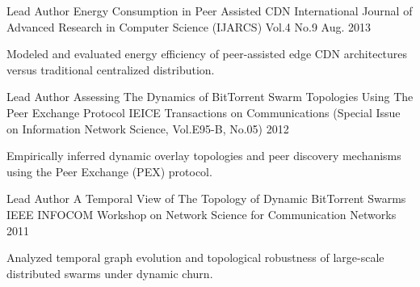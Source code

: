 

\begin{cventries}

  \cventry
    {Lead Author} %
    {Energy Consumption in Peer Assisted CDN} %
    {International Journal of Advanced Research in Computer Science (IJARCS) Vol.4 No.9} %
    {Aug. 2013} %
    {
      \begin{cvitems} %
        \item {Modeled and evaluated energy efficiency of peer-assisted edge CDN architectures versus traditional centralized distribution.}
      \end{cvitems}
    }

  \cventry
    {Lead Author} %
    {Assessing The Dynamics of BitTorrent Swarm Topologies Using The Peer Exchange Protocol} %
    {IEICE Transactions on Communications (Special Issue on Information Network Science, Vol.E95-B, No.05)} %
    {2012} %
    {
      \begin{cvitems} %
        \item {Empirically inferred dynamic overlay topologies and peer discovery mechanisms using the Peer Exchange (PEX) protocol.}
      \end{cvitems}
    }

  \cventry
    {Lead Author} %
    {A Temporal View of The Topology of Dynamic BitTorrent Swarms} %
    {IEEE INFOCOM Workshop on Network Science for Communication Networks} %
    {2011} %
    {
      \begin{cvitems} %
        \item {Analyzed temporal graph evolution and topological robustness of large-scale distributed swarms under dynamic churn.}
      \end{cvitems}
    }

\end{cventries}
